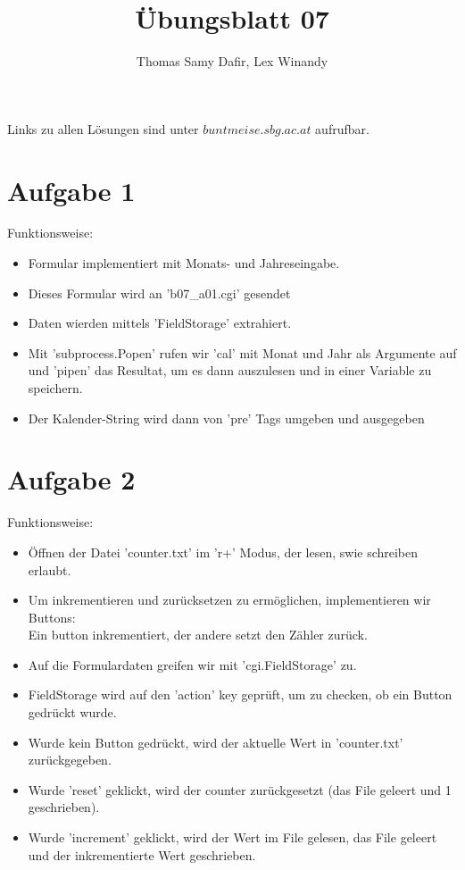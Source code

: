 \documentclass[12pt, a4paper]{report}
\title{Übungsblatt 07}
\author{Thomas Samy Dafir, Lex Winandy}
\date{}
\begin{document}
\maketitle

Links zu allen Lösungen sind unter $buntmeise.sbg.ac.at$ aufrufbar.

\section*{Aufgabe 1}
Funktionsweise:\\
\begin{itemize}
	\item Formular implementiert mit Monats- und Jahreseingabe.
	\item Dieses Formular wird an 'b07\_a01.cgi' gesendet
	\item Daten wierden mittels 'FieldStorage' extrahiert.
	\item Mit 'subprocess.Popen' rufen wir 'cal' mit Monat und Jahr als Argumente auf und 'pipen' das Resultat, um
	es dann auszulesen und in einer Variable zu speichern.
	\item Der Kalender-String wird dann von 'pre' Tags umgeben und ausgegeben
\end{itemize}

\section*{Aufgabe 2}
Funktionsweise:\\
\begin{itemize}
	\item Öffnen der Datei 'counter.txt' im 'r+' Modus, der lesen, swie schreiben erlaubt.
	\item Um inkrementieren und zurücksetzen zu ermöglichen, implementieren wir Buttons:\\
	Ein button inkrementiert, der andere setzt den Zähler zurück.
	\item Auf die Formulardaten greifen wir mit 'cgi.FieldStorage' zu.
	\item FieldStorage wird auf den 'action' key geprüft, um zu checken, ob ein Button gedrückt wurde.
	\item Wurde kein Button gedrückt, wird der aktuelle Wert in 'counter.txt' zurückgegeben.
	\item Wurde 'reset' geklickt, wird der counter zurückgesetzt (das File geleert und 1 geschrieben).
	\item Wurde 'increment' geklickt, wird der Wert im File gelesen, das File geleert und der inkrementierte
	Wert geschrieben.
\end{itemize}
\end{document}
